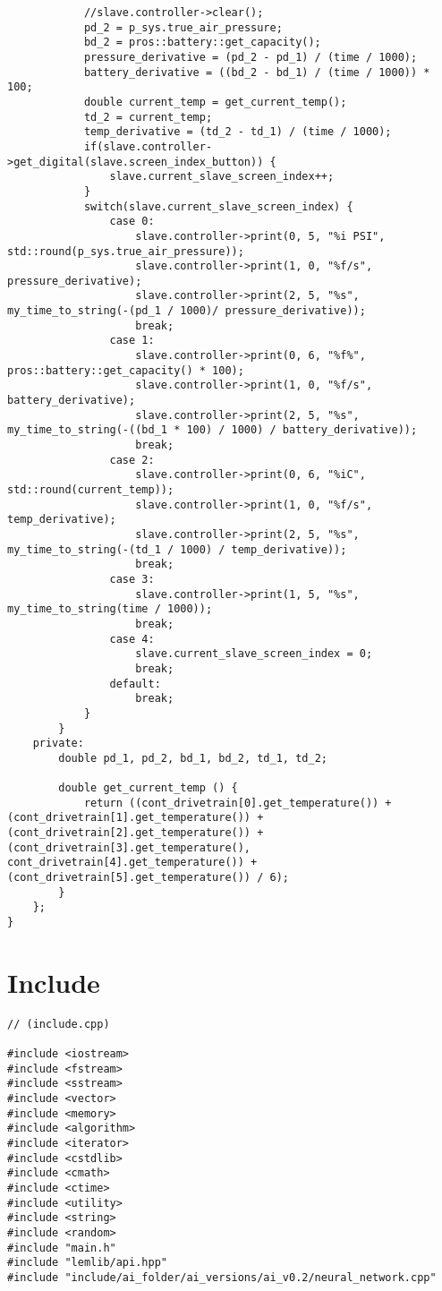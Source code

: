 \begin{verbatim}
            //slave.controller->clear();
            pd_2 = p_sys.true_air_pressure;
            bd_2 = pros::battery::get_capacity();
            pressure_derivative = (pd_2 - pd_1) / (time / 1000);
            battery_derivative = ((bd_2 - bd_1) / (time / 1000)) * 100;
            double current_temp = get_current_temp();
            td_2 = current_temp;
            temp_derivative = (td_2 - td_1) / (time / 1000);
            if(slave.controller->get_digital(slave.screen_index_button)) {
                slave.current_slave_screen_index++;
            }
            switch(slave.current_slave_screen_index) {
                case 0:
                    slave.controller->print(0, 5, "%i PSI", std::round(p_sys.true_air_pressure));
                    slave.controller->print(1, 0, "%f/s", pressure_derivative);
                    slave.controller->print(2, 5, "%s", my_time_to_string(-(pd_1 / 1000)/ pressure_derivative));
                    break;
                case 1:
                    slave.controller->print(0, 6, "%f%", pros::battery::get_capacity() * 100);
                    slave.controller->print(1, 0, "%f/s", battery_derivative);
                    slave.controller->print(2, 5, "%s", my_time_to_string(-((bd_1 * 100) / 1000) / battery_derivative));
                    break;
                case 2:
                    slave.controller->print(0, 6, "%iC", std::round(current_temp));
                    slave.controller->print(1, 0, "%f/s", temp_derivative);
                    slave.controller->print(2, 5, "%s", my_time_to_string(-(td_1 / 1000) / temp_derivative));
                    break;
                case 3:
                    slave.controller->print(1, 5, "%s", my_time_to_string(time / 1000));
                    break;
                case 4:
                    slave.current_slave_screen_index = 0;
                    break;
                default:
                    break;
            }
        }
    private:
        double pd_1, pd_2, bd_1, bd_2, td_1, td_2;

        double get_current_temp () {
            return ((cont_drivetrain[0].get_temperature()) + (cont_drivetrain[1].get_temperature()) + (cont_drivetrain[2].get_temperature()) + (cont_drivetrain[3].get_temperature(), cont_drivetrain[4].get_temperature()) + (cont_drivetrain[5].get_temperature()) / 6);
        }
    };
}
\end{verbatim}

\section*{Include}
\begin{verbatim}
// (include.cpp)

#include <iostream>
#include <fstream>
#include <sstream>
#include <vector>
#include <memory>
#include <algorithm>
#include <iterator>
#include <cstdlib>
#include <cmath>
#include <ctime>
#include <utility>
#include <string>
#include <random>
#include "main.h"
#include "lemlib/api.hpp"
#include "include/ai_folder/ai_versions/ai_v0.2/neural_network.cpp"
\end{verbatim}
